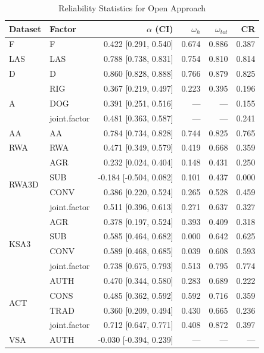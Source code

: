 \begin{table}[htbp]
\centering
\caption{Reliability Statistics for Open Approach}
\label{tab:reliability-open}
\begin{tabular}{llrrrr}
\hline
Dataset & Factor & $\alpha$ (CI) & $\omega_h$ & $\omega_{tot}$ & CR \\
\hline
F & \quad F & 0.422 [0.291, 0.540] & 0.674 & 0.886 & 0.387 \\
\hline
LAS & \quad LAS & 0.788 [0.738, 0.831] & 0.754 & 0.810 & 0.814 \\
\hline
D & \quad D & 0.860 [0.828, 0.888] & 0.766 & 0.879 & 0.825 \\
\hline
\multirow{3}{*}{A} & \quad RIG & 0.367 [0.219, 0.497] & 0.223 & 0.395 & 0.196 \\
 & \quad DOG & 0.391 [0.251, 0.516] & --- & --- & 0.155 \\
 & \quad joint.factor & 0.481 [0.363, 0.587] & --- & --- & 0.241 \\
\hline
AA & \quad AA & 0.784 [0.734, 0.828] & 0.744 & 0.825 & 0.765 \\
\hline
RWA & \quad RWA & 0.471 [0.349, 0.579] & 0.419 & 0.668 & 0.359 \\
\hline
\multirow{4}{*}{RWA3D} & \quad AGR & 0.232 [0.024, 0.404] & 0.148 & 0.431 & 0.250 \\
 & \quad SUB & -0.184 [-0.504, 0.082] & 0.101 & 0.437 & 0.000 \\
 & \quad CONV & 0.386 [0.220, 0.524] & 0.265 & 0.528 & 0.459 \\
 & \quad joint.factor & 0.511 [0.396, 0.613] & 0.271 & 0.637 & 0.327 \\
\hline
\multirow{4}{*}{KSA3} & \quad AGR & 0.378 [0.197, 0.524] & 0.393 & 0.409 & 0.318 \\
 & \quad SUB & 0.585 [0.464, 0.682] & 0.000 & 0.642 & 0.625 \\
 & \quad CONV & 0.589 [0.468, 0.685] & 0.039 & 0.608 & 0.593 \\
 & \quad joint.factor & 0.738 [0.675, 0.793] & 0.513 & 0.795 & 0.774 \\
\hline
\multirow{4}{*}{ACT} & \quad AUTH & 0.470 [0.344, 0.580] & 0.283 & 0.689 & 0.222 \\
 & \quad CONS & 0.485 [0.362, 0.592] & 0.592 & 0.716 & 0.359 \\
 & \quad TRAD & 0.360 [0.209, 0.494] & 0.430 & 0.665 & 0.236 \\
 & \quad joint.factor & 0.712 [0.647, 0.771] & 0.408 & 0.872 & 0.397 \\
\hline
\multirow{4}{*}{VSA} & \quad AUTH & -0.030 [-0.394, 0.239] & --- & --- & --- \\

\end{tabular}
\end{table}

